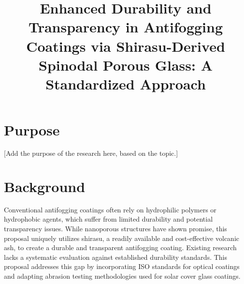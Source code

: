 \documentclass{article}
\title{Enhanced Durability and Transparency in Antifogging Coatings via Shirasu-Derived Spinodal Porous Glass: A Standardized Approach}
\author{}
\date{}
\begin{document}
\maketitle
\section{Purpose}
[Add the purpose of the research here, based on the topic.]

\section{Background}
Conventional antifogging coatings often rely on hydrophilic polymers or hydrophobic agents, which suffer from limited durability and potential transparency issues. While nanoporous structures have shown promise, this proposal uniquely utilizes shirasu, a readily available and cost-effective volcanic ash, to create a durable and transparent antifogging coating. Existing research lacks a systematic evaluation against established durability standards. This proposal addresses this gap by incorporating ISO standards for optical coatings and adapting abrasion testing methodologies used for solar cover glass coatings.
\end{document}
